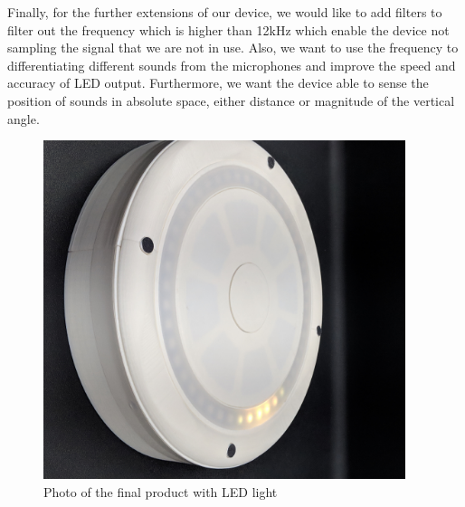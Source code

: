 \documentclass[a4paper]{article}
\begin{document}
Finally, for the further extensions of our device, we would like to add filters
to filter out the frequency which is higher than 12kHz which enable the device
not sampling the signal that we are not in use. Also, we want to use the
frequency to differentiating different sounds from the microphones and improve
the speed and accuracy of LED output.  Furthermore, we want the device able to
sense the position of sounds in absolute space, either distance or magnitude of
the vertical angle.

\begin{figure}[H]
\begin{center}
\includegraphics[width=300pt]{pictures/FinalProduct-cropped.jpg}
\caption{Photo of the final product with LED light}
\label{fig:finprod}
\end{center}
\end{figure}


\appendix
\end{document}
